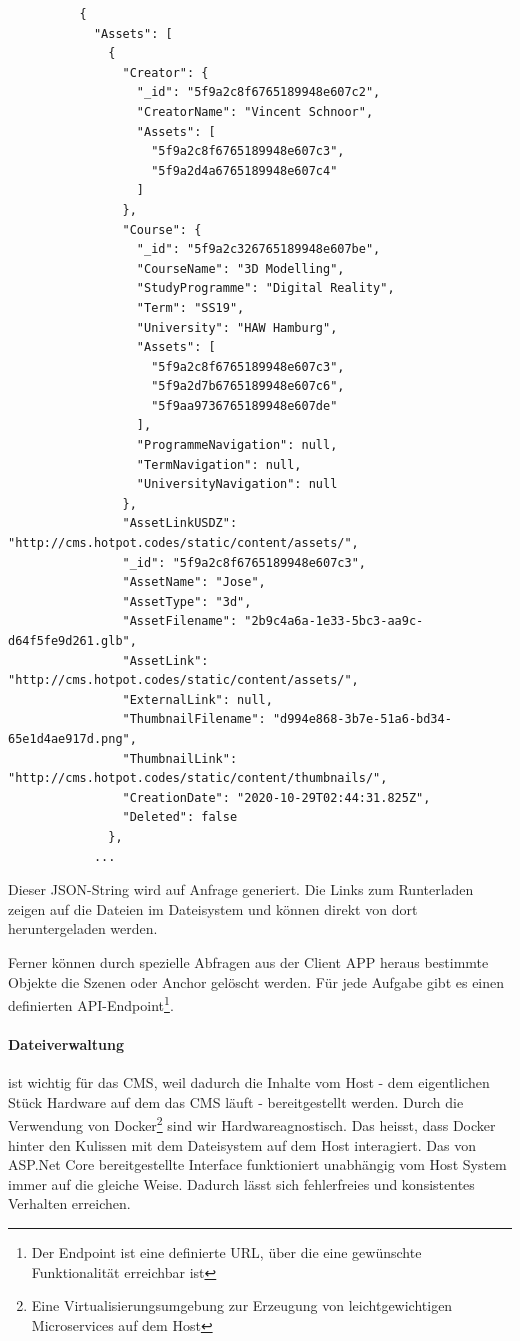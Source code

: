 \documentclass[titlepage, a4paper, 11pt]{scrartcl}
\begin{document}
        \begin{lstlisting}          
          {
            "Assets": [
              {
                "Creator": {
                  "_id": "5f9a2c8f6765189948e607c2",
                  "CreatorName": "Vincent Schnoor",
                  "Assets": [
                    "5f9a2c8f6765189948e607c3",
                    "5f9a2d4a6765189948e607c4"
                  ]
                },
                "Course": {
                  "_id": "5f9a2c326765189948e607be",
                  "CourseName": "3D Modelling",
                  "StudyProgramme": "Digital Reality",
                  "Term": "SS19",
                  "University": "HAW Hamburg",
                  "Assets": [
                    "5f9a2c8f6765189948e607c3",
                    "5f9a2d7b6765189948e607c6",
                    "5f9aa9736765189948e607de"
                  ],
                  "ProgrammeNavigation": null,
                  "TermNavigation": null,
                  "UniversityNavigation": null
                },
                "AssetLinkUSDZ": "http://cms.hotpot.codes/static/content/assets/",
                "_id": "5f9a2c8f6765189948e607c3",
                "AssetName": "Jose",
                "AssetType": "3d",
                "AssetFilename": "2b9c4a6a-1e33-5bc3-aa9c-d64f5fe9d261.glb",
                "AssetLink": "http://cms.hotpot.codes/static/content/assets/",
                "ExternalLink": null,
                "ThumbnailFilename": "d994e868-3b7e-51a6-bd34-65e1d4ae917d.png",
                "ThumbnailLink": "http://cms.hotpot.codes/static/content/thumbnails/",
                "CreationDate": "2020-10-29T02:44:31.825Z",
                "Deleted": false
              },
            ...
        \end{lstlisting}    
        
        Dieser JSON-String wird auf Anfrage generiert. Die Links zum Runterladen zeigen auf die Dateien im Dateisystem und können direkt von dort heruntergeladen werden.

        Ferner können durch spezielle Abfragen aus der Client APP heraus bestimmte Objekte die Szenen oder Anchor gelöscht werden. 
        Für jede Aufgabe gibt es einen definierten API-Endpoint\footnote{Der Endpoint ist eine definierte URL, über die eine gewünschte Funktionalität erreichbar ist}.

        \paragraph{Dateiverwaltung} ist wichtig für das CMS, weil dadurch die Inhalte vom Host - dem eigentlichen Stück Hardware auf dem das CMS läuft - bereitgestellt werden.
        Durch die Verwendung von Docker\footnote{Eine Virtualisierungsumgebung zur Erzeugung von leichtgewichtigen Microservices auf dem Host} sind wir Hardwareagnostisch.
        Das heisst, dass Docker hinter den Kulissen mit dem Dateisystem auf dem Host interagiert. Das von ASP.Net Core bereitgestellte Interface funktioniert unabhängig
        vom Host System immer auf die gleiche Weise. Dadurch lässt sich fehlerfreies und konsistentes Verhalten erreichen.
\end{document}
